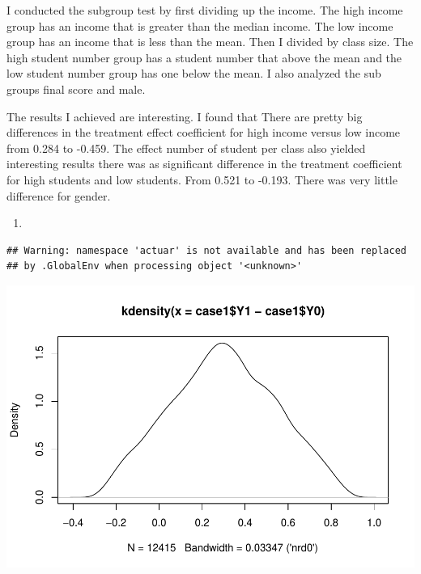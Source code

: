 \documentclass[
  12pt,
  landscape]{article}
\newenvironment{Shaded}{\begin{snugshade}}{\end{snugshade}}
\newcommand{\KeywordTok}[1]{\textcolor[rgb]{0.13,0.29,0.53}{\textbf{#1}}}
\newcommand{\NormalTok}[1]{#1}
\newcommand{\OperatorTok}[1]{\textcolor[rgb]{0.81,0.36,0.00}{\textbf{#1}}}
\begin{document}
I conducted the subgroup test by first dividing up the income. The high
income group has an income that is greater than the median income. The
low income group has an income that is less than the mean. Then I
divided by class size. The high student number group has a student
number that above the mean and the low student number group has one
below the mean. I also analyzed the sub groups final score and male.

The results I achieved are interesting. I found that There are pretty
big differences in the treatment effect coefficient for high income
versus low income from 0.284 to -0.459. The effect number of student per
class also yielded interesting results there was as significant
difference in the treatment coefficient for high students and low
students. From 0.521 to -0.193. There was very little difference for
gender.

\begin{enumerate}
\def\labelenumi{(\alph{enumi})}
\setcounter{enumi}{10}
\item
\end{enumerate}

\begin{Shaded}
\end{Shaded}

\begin{verbatim}
## Warning: namespace 'actuar' is not available and has been replaced
## by .GlobalEnv when processing object '<unknown>'
\end{verbatim}

\includegraphics{Ogle_MicroMetricsAssignment_3_Q1_files/figure-latex/unnamed-chunk-10-1.pdf}
\end{document}
